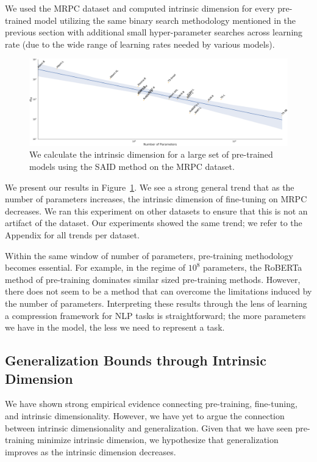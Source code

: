 \documentclass{article} %
\begin{document}
We used the MRPC dataset and computed intrinsic dimension for every pre-trained model utilizing the same binary search methodology mentioned in the previous section with additional small hyper-parameter searches across learning rate (due to the wide range of learning rates needed by various models). 

\begin{figure}[h]
    \centering
    \includegraphics[width=1.0\textwidth]{figures/mrpc_parameter_id.pdf}
    \caption{We calculate the intrinsic dimension for a large set of pre-trained models using the SAID method on the MRPC dataset.}
    \label{fig:mrpc_parameter_id}
\end{figure}

We present our results in Figure~\ref{fig:mrpc_parameter_id}. We see a strong general trend that as the number of parameters increases, the intrinsic dimension of fine-tuning on MRPC decreases. We ran this experiment on other datasets to ensure that this is not an artifact of the dataset. Our experiments showed the same trend; we refer to the Appendix for all trends per dataset.

Within the same window of number of parameters, pre-training methodology becomes essential. For example, in the regime of $10^8$ parameters, the RoBERTa method of pre-training dominates similar sized pre-training methods. However, there does not seem to be a method that can overcome the limitations induced by the number of parameters. Interpreting these results through the lens of learning a compression framework for NLP tasks is straightforward; the more parameters we have in the model, the less we need to represent a task.


\subsection{Generalization Bounds through Intrinsic Dimension}
\label{sec:generalization}
We have shown strong empirical evidence connecting pre-training, fine-tuning, and intrinsic dimensionality. However, we have yet to argue the connection between intrinsic dimensionality and generalization. Given that we have seen pre-training minimize intrinsic dimension, we hypothesize that generalization improves as the intrinsic dimension decreases.
\end{document}
